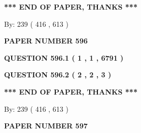 \documentclass[12pt]{article}
\begin{document}
   
   
   
   
\vspace{1.0in} 
{\textbf{\large{ *** END OF PAPER, THANKS *** }}} 
   
   
\hspace{1.0in} By: 
 239 ( 416 ,  613 )
   
   
   
   
\newpage 
\setcounter{page}{ 
   596001 } 
   
   
   
   
 {\textbf{ \Large{ PAPER NUMBER  596  }}}
   
   
\vspace{0.2in}
   
   
   
   
   
   
 \vspace{0.2in}
 
 
 
 
   
   
  
\vspace{0.2in}
  
{\textbf{\Large{QUESTION
596.1 
 ( 1 , 1 , 6791 )
}}}
  
  
  
\vspace{0.2in}
  
{\textbf{\Large{QUESTION
596.2 
 ( 2 , 2 , 3 )
}}}
  
  
   
   
 \vspace{0.2in}
 
   
   
   
   
\vspace{1.0in} 
{\textbf{\large{ *** END OF PAPER, THANKS *** }}} 
   
   
\hspace{1.0in} By: 
 239 ( 416 ,  613 )
   
   
   
   
\newpage 
\setcounter{page}{ 
   597001 } 
   
   
   
   
 {\textbf{ \Large{ PAPER NUMBER  597  }}}
   
   
\vspace{0.2in}
   
\end{document}
